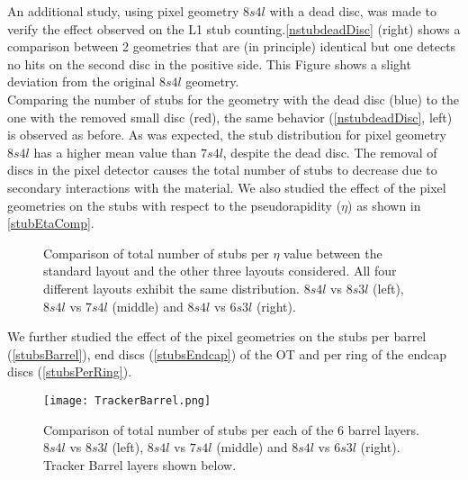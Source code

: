 An additional study, using pixel geometry $8s4l$ with a dead disc, was made to verify the effect observed on the L1 stub counting.\autoref{nstubdeadDisc} (right) shows a comparison between 2 geometries that are (in principle) identical but one detects no hits on the second disc in the positive side. This Figure shows a slight deviation from the original $8s4l$ geometry.\\

Comparing the number of stubs for the geometry with the dead disc (blue) to the one with the removed small disc (red), the same behavior (\autoref{nstubdeadDisc}, left) is observed as before. As was expected, the stub distribution for pixel geometry $8s4l$ has a higher mean value than $7s4l$, despite the dead disc. The removal of discs in the pixel detector causes the total number of stubs to decrease due to secondary interactions with the material. We also studied the effect of the pixel geometries on the stubs with respect to the pseudorapidity ($\eta$) as shown in \autoref{stubEtaComp}. 

\begin{figure}[H]
    \centering
     \caption{Comparison of total number of stubs per $\eta$ value between the standard layout and the other three layouts considered. All four different layouts exhibit the same distribution. $8s4l$ vs $8s3l$ (left), $8s4l$ vs $7s4l$ (middle) and $8s4l$ vs $6s3l$ (right).}
\label{stubEtaComp}
\end{figure}

\vspace{1em}

We further studied the effect of the pixel geometries on the stubs per barrel (\autoref{stubsBarrel}), end discs (\autoref{stubsEndcap}) of the OT and per ring of the endcap discs (\autoref{stubsPerRing}).

\begin{figure}[H]
    \centering
\texttt{[image: TrackerBarrel.png]}
  \caption{Comparison of total number of stubs per each of the 6 barrel layers. $8s4l$ vs $8s3l$ (left), $8s4l$ vs $7s4l$ (middle) and $8s4l$ vs $6s3l$ (right). Tracker Barrel layers shown below.}
\label{stubsBarrel}
\end{figure}

